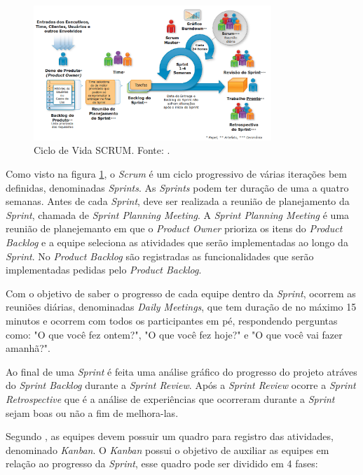 \begin{figure}[H]
	\centering
	\includegraphics[width=0.8\textwidth]{figuras/ciclo_de_vida_scrum.png}
	\caption{Ciclo de Vida SCRUM. Fonte: .}
	\label{img:ciclo_de_vida_scrum}
\end{figure}

Como visto na figura \ref{img:ciclo_de_vida_scrum}, o \textit{Scrum} é um ciclo progressivo de várias iterações bem definidas, denominadas \textit{Sprints}. As \textit{Sprints} podem ter duração de uma a quatro semanas. Antes de cada \textit{Sprint}, deve ser realizada a reunião de planejamento da \textit{Sprint}, chamada de \textit{Sprint Planning Meeting}. A \textit{Sprint Planning Meeting} é uma reunião de planejemanto em que o \textit{Product Owner}
prioriza os itens do \textit{Product Backlog} e a equipe seleciona as atividades que serão implementadas ao longo da \textit{Sprint}. No \textit{Product Backlog} são registradas as funcionalidades que serão implementadas pedidas pelo \textit{Product Backlog}. 

Com o objetivo de saber o progresso de cada equipe dentro da \textit{Sprint}, ocorrem as reuniões diárias, denominadas \textit{Daily Meetings}, que tem duração de no máximo 15 minutos e ocorrem com todos os participantes em pé, respondendo perguntas como: "O que você fez ontem?", "O que você fez hoje?" e "O que você vai fazer amanhã?". 

Ao final de uma \textit{Sprint} é feita uma análise gráfico do progresso do projeto atráves do \textit{Sprint Backlog} durante a \textit{Sprint Review}. Após a \textit{Sprint Review} ocorre a \textit{Sprint Retrospective} que é a análise de experiências que ocorreram durante a \textit{Sprint} sejam boas ou não a fim de melhora-las.

Segundo , as equipes devem possuir um quadro para registro das atividades, denominado \textit{Kanban}. O \textit{Kanban} possui o objetivo de auxiliar as equipes em relação ao progresso da \textit{Sprint}, esse quadro pode ser dividido em 4 fases:

